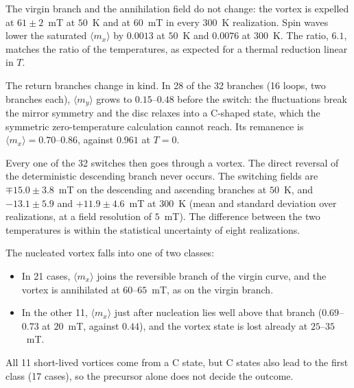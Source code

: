 \documentclass{article}      %
\begin{document}
The virgin branch and the annihilation field do not change: the vortex is expelled
at $61\pm2$~mT at $50$~K and at $60$~mT in every $300$~K realization. Spin waves
lower the saturated $\langle m_x\rangle$ by $0.0013$ at $50$~K and $0.0076$ at
$300$~K. The ratio, $6.1$, matches the ratio of the temperatures, as expected for
a thermal reduction linear in $T$.

The return branches change in kind. In 28 of the 32 branches (16 loops, two
branches each), $\langle m_y\rangle$ grows to $0.15$--$0.48$ before the switch:
the fluctuations break the mirror symmetry and the disc relaxes into a C-shaped
state, which the symmetric zero-temperature calculation cannot reach. Its
remanence is $\langle m_x\rangle=0.70$--$0.86$, against $0.961$ at $T=0$.

Every one of the 32 switches then goes through a vortex. The direct reversal of
the deterministic descending branch never occurs. The switching fields are
$\mp15.0\pm3.8$~mT on the descending and ascending branches at $50$~K, and
$-13.1\pm5.9$ and $+11.9\pm4.6$~mT at $300$~K (mean and standard deviation over
realizations, at a field resolution of $5$~mT). The difference between the two
temperatures is within the statistical uncertainty of eight realizations.

The nucleated vortex falls into one of two classes:
\begin{itemize}
  \item In 21 cases, $\langle m_x\rangle$ joins the reversible branch of the
  virgin curve, and the vortex is annihilated at $60$--$65$~mT, as on the virgin
  branch.
  \item In the other 11, $\langle m_x\rangle$ just after nucleation lies well above
  that branch ($0.69$--$0.73$ at $20$~mT, against $0.44$), and the vortex state
  is lost already at $25$--$35$~mT.
\end{itemize}
All 11 short-lived vortices come from a C state, but C states also lead to the
first class (17 cases), so the precursor alone does not decide the outcome.
\end{document}
